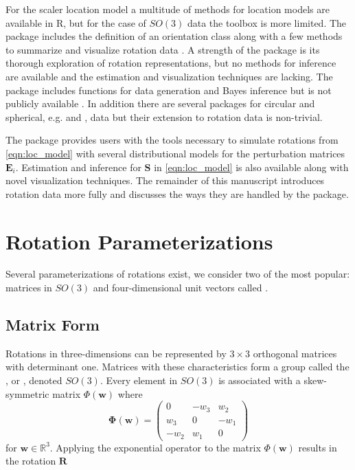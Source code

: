 For the scaler location model a multitude of methods for location models are available in R, but for the case of $SO(3)$ data the toolbox is more limited.  The  package includes the definition of an orientation class along with a few methods to summarize and visualize rotation data \citep{murdoch2003}.  A strength of the  package is its thorough exploration of rotation representations, but no methods for inference are available and the estimation and visualization techniques are lacking.  The  package includes functions for data generation and Bayes inference but is not publicly available \citet{qu2013}.  In addition there are several packages for circular and spherical, e.g.  and , data but their extension to rotation data is non-trivial.

The  package provides users with the tools necessary to simulate rotations from \eqref{eqn:loc_model} with several distributional models for the perturbation matrices $\bm E_i$.  Estimation and inference for $\bm{S}$ in \eqref{eqn:loc_model} is also available along with novel visualization techniques.  The remainder of this manuscript introduces rotation data more fully and discusses the ways they are handled by the  package.


\section{Rotation Parameterizations}

Several parameterizations of rotations exist, we consider two of the most popular: matrices in $SO(3)$ and four-dimensional unit vectors called .  

\subsection{Matrix Form}

Rotations in three-dimensions can be represented by $3\times3$ orthogonal matrices with determinant one.  Matrices with these characteristics form a group called the , or , denoted $SO(3)$.  Every element in $SO(3)$ is associated with a skew-symmetric matrix $\Phi(\bm w)$ where
\[
\bm{\Phi}(\bm{w}) = \left(\begin{array}{ccc}0 & -w_3 & w_2 \\ w_3 & 0 & -w_1 \\-w_2 & w_1 & 0\end{array}\right)
\]
for $\bm w\in\mathbb{R}^3$.  Applying the exponential operator to the matrix $\Phi(\bm w)$ results in the rotation $\bm R$

